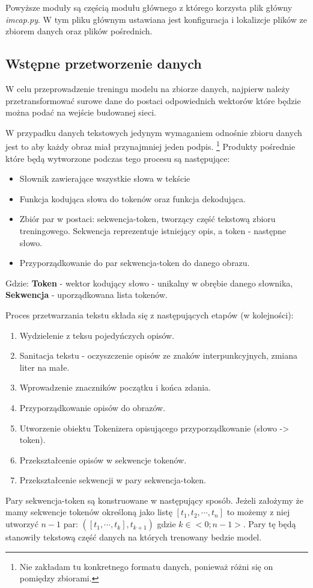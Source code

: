Powyższe moduły są częścią modułu głównego z którego korzysta plik główny \textit{imcap.py}. W tym pliku głównym ustawiana jest konfiguracja i lokalizcje plików ze zbiorem danych oraz plików pośrednich.
\subsection{Wstępne przetworzenie danych}
W celu przeprowadzenie treningu modelu na zbiorze danych, najpierw należy przetransformować surowe dane do postaci odpowiednich wektorów które będzie można podać na wejście budowanej sieci.

W przypadku danych tekstowych jedynym wymaganiem odnośnie zbioru danych jest to aby każdy obraz miał przynajmniej jeden podpis.
\footnote{Nie zakładam tu konkretnego formatu danych, ponieważ różni się on pomiędzy zbiorami.} Produkty pośrednie które będą wytworzone podczas tego procesu są następujące:
\begin{itemize}
  \item Słownik zawierające wszystkie słowa w tekście
  \item Funkcja kodująca słowa do tokenów oraz funkcja dekodująca.
  \item Zbiór par w postaci: sekwencja-token, tworzący część tekstową zbioru treningowego. Sekwencja reprezentuje istniejący opis, a token - następne słowo.
  \item Przyporządkowanie do par sekwencja-token do danego obrazu.
\end{itemize} 
Gdzie: \textbf{Token} - wektor kodujący słowo - unikalny w obrębie danego słownika,
\textbf{Sekwencja} - uporządkowana lista tokenów.

Proces przetwarzania tekstu składa się z następujących etapów (w kolejności):
\begin{enumerate}
	\item Wydzielenie z teksu pojedyńczych opisów.
	\item Sanitacja tekstu - oczyszczenie opisów ze znaków interpunkcyjnych, zmiana liter na małe.
	\item Wprowadzenie znaczników początku i końca zdania.
	\item Przyporządkowanie opisów do obrazów.
	\item Utworzenie obiektu Tokenizera opisującego przyporządkowanie (słowo -> token).
	\item Przekształcenie opisów w sekwencje tokenów.
	\item Przekształcenie sekwencji w pary sekwencja-token.
\end{enumerate}
Pary sekwencja-token są konstruowane w następujący sposób. Jeżeli założymy że mamy sekwencje tokenów określoną jako listę
$[t_1,t_2,\cdots, t_n]$ to możemy z niej utworzyć $n-1$ par: $([t_1,\cdots,t_{k}],t_{k+1})$ gdzie $k \in <0;n-1>$.
Pary tę będą stanowiły tekstową część danych na których trenowany bedzie model.

